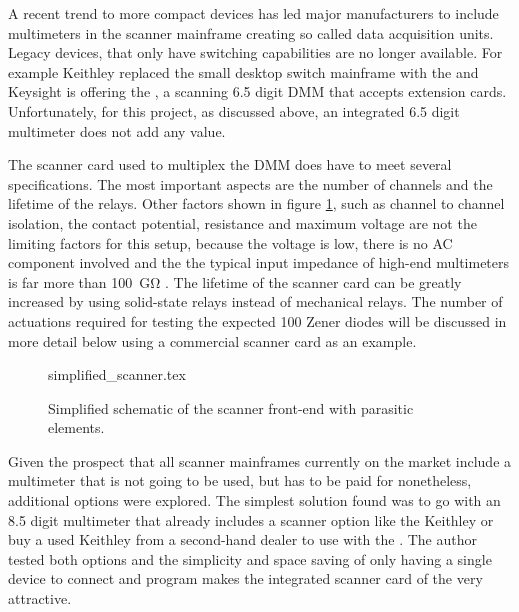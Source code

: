 A recent trend to more compact devices has led major manufacturers to include multimeters in the scanner mainframe creating so called data acquisition units. Legacy devices, that only have switching capabilities are no longer available. For example Keithley replaced the small desktop switch mainframe  with the  and Keysight is offering the , a scanning \num{6.5} digit DMM that accepts extension cards. Unfortunately, for this project, as discussed above, an integrated \num{6.5} digit multimeter does not add any value.

The scanner card used to multiplex the DMM does have to meet several specifications. The most important aspects are the number of channels and the lifetime of the relays. Other factors shown in figure \ref{fig:simplified_scanner}, such as channel to channel isolation, the contact potential, resistance and maximum voltage are not the limiting factors for this setup, because the voltage is low, there is no AC component involved and the the typical input impedance of high-end multimeters is far more than \qty{100}{\giga\ohm} \cite{datasheet_fluke8588A,article_3458A_input_impedance_2,datasheet_keithley2002,article_3458A_input_impedance}. The lifetime of the scanner card can be greatly increased by using solid-state relays instead of mechanical relays. The number of actuations required for testing the expected \num{100} Zener diodes will be discussed in more detail below using a commercial scanner card as an example.
\begin{figure}[htb]
    \centering
        {simplified_scanner.tex}
    \caption{Simplified schematic of the scanner front-end with parasitic elements.}
    \label{fig:simplified_scanner}
\end{figure}

Given the prospect that all scanner mainframes currently on the market include a multimeter that is not going to be used, but has to be paid for nonetheless, additional options were explored. The simplest solution found was to go with an \num{8.5} digit multimeter that already includes a scanner option like the Keithley  or buy a used Keithley  from a second-hand dealer to use with the . The author tested both options and the simplicity and space saving of only having a single device to connect and program makes the integrated scanner card of the  very attractive.

